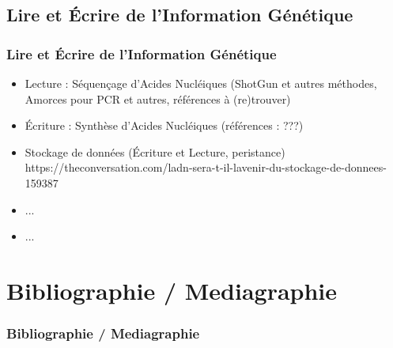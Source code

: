 \documentclass{beamer}
\begin{document}
\subsection{ Lire et {\'E}crire de l'Information G{\'e}n{\'e}tique }
\begin{frame}
	\frametitle{ Lire et {\'E}crire de l'Information G{\'e}n{\'e}tique }
	\begin{itemize}
		\item Lecture : S{\'e}quen\c{c}age d'Acides Nucl{\'e}iques (ShotGun et autres m{\'e}thodes, Amorces pour PCR et autres, r{\'e}f{\'e}rences {\`a} (re)trouver)
		\item {\'E}criture : Synth{\`e}se d'Acides Nucl{\'e}iques (r{\'e}f{\'e}rences : ???)
		\item Stockage de donn{\'e}es ({\'E}criture et Lecture, peristance) \newline
			https://theconversation.com/ladn-sera-t-il-lavenir-du-stockage-de-donnees-159387
		\item ... 
		\item ... 
	\end{itemize}
\end{frame}


\def\sectionPartBibliographie{Bibliographie / Mediagraphie}
\section{\sectionPartBibliographie}
\begin{frame}[allowframebreaks]
	\frametitle{\sectionPartBibliographie}
	\nocite{*}
	
	
\end{frame}
\end{document}
